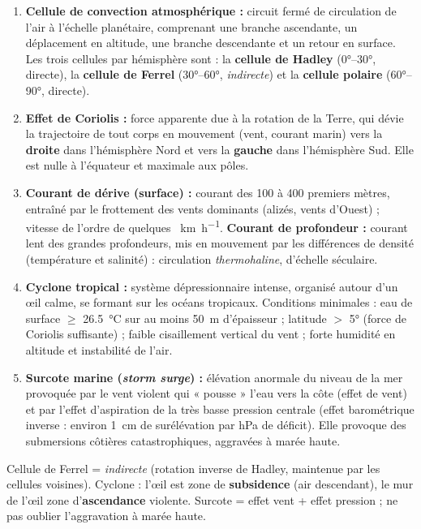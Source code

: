 \documentclass[11pt]{article}
\newcommand{\cle}[1]{{\popxbold\color{popdark}#1}}
\begin{document}
\begin{corrige}
\begin{enumerate}
    \item \textbf{\cle{Cellule de convection atmosphérique} :} circuit fermé de circulation de l'air à l'échelle planétaire, comprenant une branche ascendante, un déplacement en altitude, une branche descendante et un retour en surface. Les trois cellules par hémisphère sont : la \textbf{cellule de Hadley} (0°–30°, directe), la \textbf{cellule de Ferrel} (30°–60°, \emph{indirecte}) et la \textbf{cellule polaire} (60°–90°, directe).
    \item \textbf{\cle{Effet de Coriolis} :} force apparente due à la rotation de la Terre, qui dévie la trajectoire de tout corps en mouvement (vent, courant marin) vers la \textbf{droite} dans l'hémisphère Nord et vers la \textbf{gauche} dans l'hémisphère Sud. Elle est nulle à l'équateur et maximale aux pôles.
    \item \textbf{\cle{Courant de dérive} (surface) :} courant des 100 à 400 premiers mètres, entraîné par le frottement des vents dominants (alizés, vents d'Ouest) ; vitesse de l'ordre de quelques \SI{}{\kilo\meter\per\hour}. \textbf{Courant de profondeur :} courant lent des grandes profondeurs, mis en mouvement par les différences de densité (température et salinité) : circulation \emph{thermohaline}, d'échelle séculaire.
    \item \textbf{\cle{Cyclone tropical} :} système dépressionnaire intense, organisé autour d'un œil calme, se formant sur les océans tropicaux. Conditions minimales : eau de surface $\geq$ \SI{26,5}{\celsius} sur au moins \SI{50}{\meter} d'épaisseur ; latitude $>$ 5° (force de Coriolis suffisante) ; faible cisaillement vertical du vent ; forte humidité en altitude et instabilité de l'air.
    \item \textbf{\cle{Surcote marine} (\emph{storm surge}) :} élévation anormale du niveau de la mer provoquée par le vent violent qui « pousse » l'eau vers la côte (effet de vent) et par l'effet d'aspiration de la très basse pression centrale (effet barométrique inverse : environ \SI{1}{\centi\meter} de surélévation par hPa de déficit). Elle provoque des submersions côtières catastrophiques, aggravées à marée haute.
\end{enumerate}
\end{corrige}

\begin{attention}
Cellule de Ferrel = \emph{indirecte} (rotation inverse de Hadley, maintenue par les cellules voisines). Cyclone : l'œil est zone de \textbf{subsidence} (air descendant), le mur de l'œil zone d'\textbf{ascendance} violente. Surcote = effet vent + effet pression ; ne pas oublier l'aggravation à marée haute.
\end{attention}
\end{document}
